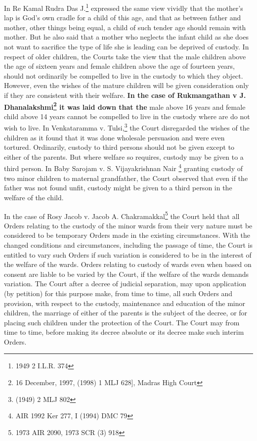 \begin{multicols}{2}

\noi
In Re Kamal Rudra Das J.\footnote{1949 2 I.L.R. 374} expressed the same view vividly that the mother's lap is God's own
cradle for a child of this age, and that as between father and mother, other things being equal, a
child of such tender age should remain with mother. But he also said that a mother who neglects
the infant child as she does not want to sacrifice the type of life she is leading can be deprived of
custody. In respect of older children, the Courts take the view that the male children above the
age of sixteen years and female children above the age of fourteen years, should not ordinarily be
compelled to live in the custody to which they object. However, even the wishes of the mature
children will be given consideration only if they are consistent with their welfare. \textbf{In the case
of Rukmangathan v J. Dhanalakshmi\footnote{16 December, 1997, (1998) 1 MLJ 628], Madras High Court} it was laid down that the} male above 16 years and female child above 14 years cannot be compelled to live in the custody where are do not wish to live. In Venkataramma v. Tulsi,\footnote{(1949) 2 MLJ 802} the Court disregarded the wishes of the children as it found that it was done wholesale persuasion and were even tortured. Ordinarily,
custody to third persons should not be given except to either of the parents. But where welfare so
requires, custody may be given to a third person. In Baby Sarojam v. S. Vijayakrishnan Nair \footnote{AIR 1992 Ker 277, I (1994) DMC 79} granting custody of two minor children to maternal grandfather, the Court observed that even if the father was not found unfit, custody might be given to a third person in the welfare of the child.

\vspace{-.1cm}

\noi
In the case of Rosy Jacob v. Jacob A. Chakramakkal\footnote{1973 AIR 2090, 1973 SCR (3) 918} the Court held that all Orders relating to the custody of the minor wards from their very nature must be considered to be temporary Orders made in the existing circumstances. With the changed conditions and circumstances, including the passage of time, the Court is entitled to vary such Orders if such variation is considered to be in the interest of the welfare of the wards. Orders relating to custody of wards even when based on consent are liable to be varied by the Court, if the welfare of the wards demands variation. The Court after a decree of judicial separation, may upon application (by petition) for this purpose make, from time to time, all such Orders and provision, with respect to the custody, maintenance and education of the minor children, the marriage of either of the parents is the subject of the decree, or for placing such children under the protection of the Court. The Court may from time
to time, before making its decree absolute or its decree make such interim Orders.


\end{multicols}
